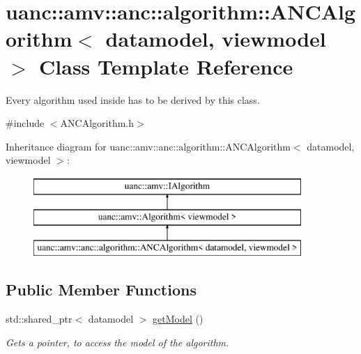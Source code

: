 \hypertarget{classuanc_1_1amv_1_1anc_1_1algorithm_1_1_a_n_c_algorithm}{}\section{uanc\+:\+:amv\+:\+:anc\+:\+:algorithm\+:\+:A\+N\+C\+Algorithm$<$ datamodel, viewmodel $>$ Class Template Reference}
\label{classuanc_1_1amv_1_1anc_1_1algorithm_1_1_a_n_c_algorithm}


Every algorithm used inside has to be derived by this class.  




{\ttfamily \#include $<$A\+N\+C\+Algorithm.\+h$>$}

Inheritance diagram for uanc\+:\+:amv\+:\+:anc\+:\+:algorithm\+:\+:A\+N\+C\+Algorithm$<$ datamodel, viewmodel $>$\+:\begin{figure}[H]
\begin{center}
\leavevmode
\includegraphics[height=3.000000cm]{classuanc_1_1amv_1_1anc_1_1algorithm_1_1_a_n_c_algorithm}
\end{center}
\end{figure}
\subsection*{Public Member Functions}
\begin{DoxyCompactItemize}
\item 
std\+::shared\+\_\+ptr$<$ datamodel $>$ \hyperlink{classuanc_1_1amv_1_1anc_1_1algorithm_1_1_a_n_c_algorithm_a12ce80f6746cbb440cf771fc6878f7cf}{get\+Model} ()
\begin{DoxyCompactList}\small\item\em Gets a pointer, to access the model of the algorithm. \end{DoxyCompactList}\end{DoxyCompactItemize}
